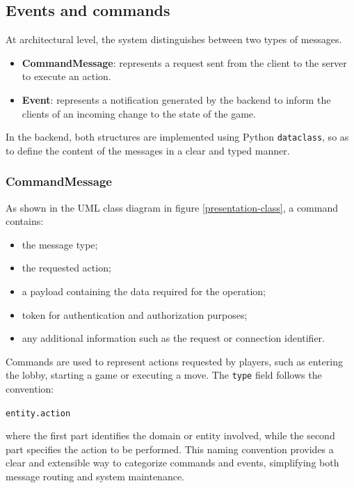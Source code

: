 \documentclass{scrartcl}
\begin{document}
\subsection{Events and commands}

  At architectural level, the system distinguishes between two types of messages.
    \begin{itemize}
      \item \textbf{CommandMessage}: represents a request sent from the client to the server to execute an action.
      \item \textbf{Event}: represents a notification generated by the backend to inform the clients of an incoming change to the state of the game.
    \end{itemize}
  In the backend, both structures are implemented using Python \texttt{dataclass}, so as to define the content of the messages in a clear and typed manner.
  \subsubsection{CommandMessage}
  As shown in the UML class diagram in figure \autoref{presentation-class}, a command contains:
  \begin{itemize}
    \item the message type;
    \item the requested action;
    \item a payload containing the data required for the operation;
    \item token for authentication and authorization purposes;
    \item any additional information such as the request or connection identifier.
  \end{itemize}
  Commands are used to represent actions requested by players, such as entering the lobby, starting a game or executing a move.
  The \texttt{type} field follows the convention:
  \begin{center}
  \texttt{entity.action}
\end{center}

where the first part identifies the domain or entity involved, while the second part specifies the action to be performed.
This naming convention provides a clear and extensible way to categorize commands and events, simplifying both message routing and system maintenance.
\end{document}
